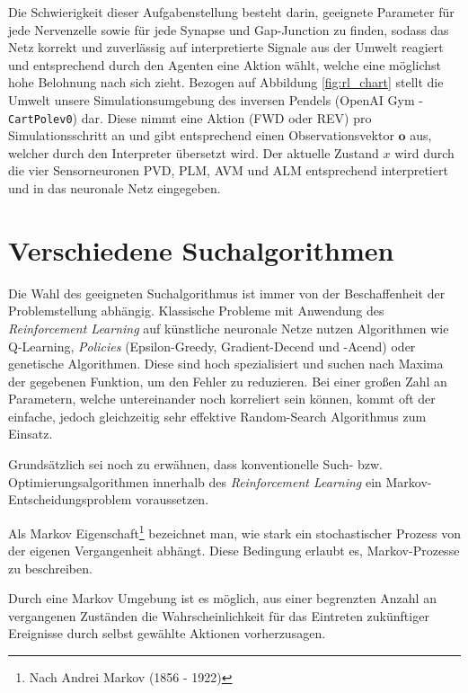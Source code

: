 	Die Schwierigkeit dieser Aufgabenstellung besteht darin, geeignete Parameter für jede Nervenzelle sowie für jede Synapse und Gap-Junction zu finden, sodass das Netz korrekt und zuverlässig auf interpretierte Signale aus der Umwelt reagiert und entsprechend durch den Agenten eine Aktion wählt, welche eine möglichst hohe Belohnung nach sich zieht. Bezogen auf Abbildung \ref{fig:rl_chart} stellt die Umwelt unsere Simulationsumgebung des inversen Pendels (OpenAI Gym - \texttt{CartPolev0}) dar. Diese nimmt eine Aktion (FWD oder REV) pro Simulationsschritt an und gibt entsprechend einen Observationsvektor $\textbf{o}$ aus, welcher durch den Interpreter übersetzt wird. Der aktuelle Zustand $x$ wird durch die vier Sensorneuronen PVD, PLM, AVM und ALM entsprechend interpretiert und in das neuronale Netz eingegeben.

\section{Verschiedene Suchalgorithmen}
\label{sec:rl_alt}
	Die Wahl des geeigneten Suchalgorithmus ist immer von der Beschaffenheit der Problemstellung abhängig. Klassische Probleme mit Anwendung des \textit{Reinforcement Learning} auf künstliche neuronale Netze nutzen Algorithmen wie Q-Learning, \textit{Policies} (Epsilon-Greedy, Gradient-Decend und -Acend) oder genetische Algorithmen. Diese sind hoch spezialisiert und suchen nach Maxima der gegebenen Funktion, um den Fehler zu reduzieren. Bei einer großen Zahl an Parametern, welche untereinander noch korreliert sein können, kommt oft der einfache, jedoch gleichzeitig sehr effektive \glqq Random-Search\grqq{} Algorithmus zum Einsatz.
	
	Grundsätzlich sei noch zu erwähnen, dass konventionelle Such- bzw. Optimierungsalgorithmen innerhalb des \textit{Reinforcement Learning} ein Markov-Entscheidungsproblem voraussetzen. 
	\begin{remark}
		Als Markov Eigenschaft\footnote{Nach Andrei Markov (1856 - 1922)} bezeichnet man, wie stark ein stochastischer Prozess von der eigenen Vergangenheit abhängt. Diese Bedingung erlaubt es, Markov-Prozesse zu beschreiben.
		
		Durch eine Markov Umgebung ist es möglich, aus einer begrenzten Anzahl an vergangenen Zuständen die Wahrscheinlichkeit für das Eintreten zukünftiger Ereignisse durch selbst gewählte Aktionen vorherzusagen. \cite{SilverRL}
	\end{remark}
	
